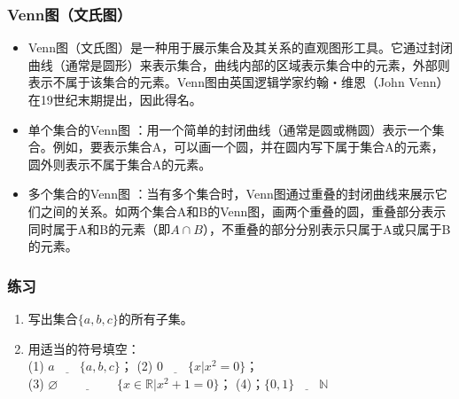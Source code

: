 \documentclass[aspectratio=169]{ctexbeamer} %
\begin{document}
\begin{frame}
\frametitle{Venn图（文氏图）}
\begin{itemize}
\item Venn图（文氏图）是一种用于展示集合及其关系的直观图形工具。它通过封闭曲线（通常是圆形）来表示集合，曲线内部的区域表示集合中的元素，外部则表示不属于该集合的元素。Venn图由英国逻辑学家约翰・维恩（John Venn）在19世纪末期提出，因此得名。
\item 单个集合的Venn图 ：用一个简单的封闭曲线（通常是圆或椭圆）表示一个集合。例如，要表示集合A，可以画一个圆，并在圆内写下属于集合A的元素，圆外则表示不属于集合A的元素。
\item 多个集合的Venn图 ：当有多个集合时，Venn图通过重叠的封闭曲线来展示它们之间的关系。如两个集合A和B的Venn图，画两个重叠的圆，重叠部分表示同时属于A和B的元素（即$A \cap B$），不重叠的部分分别表示只属于A或只属于B的元素。
\end{itemize}

\begin{figure}[h]
\centering
{}
\label{venn:subset_ellipse}
\end{figure}

\end{frame}

\begin{frame}
\frametitle{练习}
\begin{enumerate}[label={\arabic*.}]
\item 写出集合\(\{a, b, c\}\)的所有子集。
\item 用适当的符号填空：\\
(1) $a \underline{\hspace{2em}} \{a, b, c\}$；\hspace{3cm} (2) $0 \underline{\hspace{2em}} \{ x | x^2 = 0 \}$；\\
(3) $\varnothing \underline{\hspace{2cm}} \{ x \in \mathbb{R} | x^2 + 1 = 0 \} $；\hspace{3cm} (4)；$\{0, 1\} \underline{\hspace{2em}} \mathbb{N}$
\end{enumerate}
\end{frame}
\end{document}
